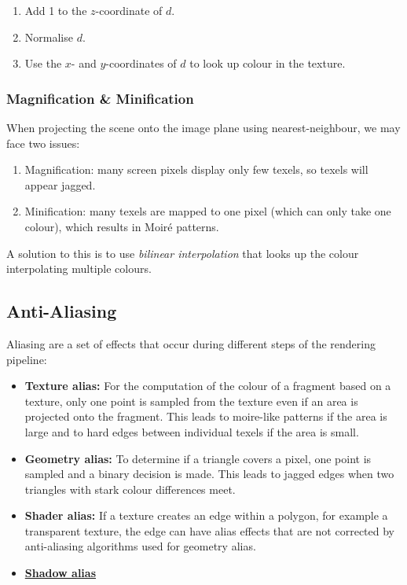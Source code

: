\documentclass[english]{panikzettel}
\begin{document}
\begin{enumerate}
    \item Add 1 to the $z$-coordinate of $d$.
    \item Normalise $d$.
    \item Use the $x$- and $y$-coordinates of $d$ to look up colour in the texture.
\end{enumerate}

\subsubsection*{Magnification \& Minification}
When projecting the scene onto the image plane using nearest-neighbour, we may face two issues:
\begin{enumerate}
    \item Magnification: many screen pixels display only few texels, so texels will appear jagged.
    \item Minification: many texels are mapped to one pixel (which can only take one colour), which results in Moiré patterns.
\end{enumerate}

A solution to this is to use \emph{bilinear interpolation} that looks up the colour interpolating multiple colours.

\subsection{Anti-Aliasing}
Aliasing are a set of effects that occur during different steps of the rendering pipeline:

\begin{itemize}
    \item \textbf{Texture alias:} For the computation of the colour of a fragment based on a texture, only one point is sampled from the texture even if an area is projected onto the fragment. This leads to moire-like patterns if the area is large and to hard edges between individual texels if the area is small.
    \item \textbf{Geometry alias:} To determine if a triangle covers a pixel, one point is sampled and a binary decision is made. This leads to jagged edges when two triangles with stark colour differences meet.
    \item \textbf{Shader alias:} If a texture creates an edge within a polygon, for example a transparent texture, the edge can have alias effects that are not corrected by anti-aliasing algorithms used for geometry alias.
    \item \hyperref[subsubsec::perspectiveShadowMaps]{\textbf{Shadow alias}}
\end{itemize}
\end{document}
